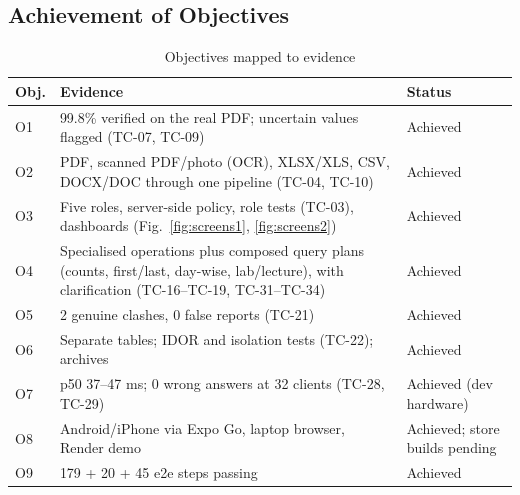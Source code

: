 \subsection{Achievement of Objectives}
\begin{table}[H]
\centering
\caption{Objectives mapped to evidence}
\label{tab:objectives}
\small
\begin{tabularx}{\textwidth}{@{}p{0.8cm}Xp{1.9cm}@{}}
\toprule
\textbf{Obj.} & \textbf{Evidence} & \textbf{Status}\\
\midrule
O1 & 99.8\% verified on the real PDF; uncertain values flagged (TC-07, TC-09) & Achieved\\
O2 & PDF, scanned PDF/photo (OCR), XLSX/XLS, CSV, DOCX/DOC through one pipeline (TC-04, TC-10) & Achieved\\
O3 & Five roles, server-side policy, role tests (TC-03), dashboards (Fig.~\ref{fig:screens1}, \ref{fig:screens2}) & Achieved\\
O4 & Specialised operations plus composed query plans (counts, first/last, day-wise, lab/lecture), with clarification (TC-16--TC-19, TC-31--TC-34) & Achieved\\
O5 & 2 genuine clashes, 0 false reports (TC-21) & Achieved\\
O6 & Separate tables; IDOR and isolation tests (TC-22); archives & Achieved\\
O7 & p50 37--47 ms; 0 wrong answers at 32 clients (TC-28, TC-29) & Achieved (dev hardware)\\
O8 & Android/iPhone via Expo Go, laptop browser, Render demo & Achieved; store builds pending\\
O9 & 179 + 20 + 45 e2e steps passing & Achieved\\
\bottomrule
\end{tabularx}
\end{table}

